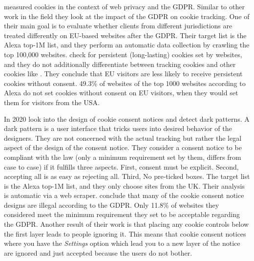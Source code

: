  measured cookies in the context of web privacy and the GDPR. Similar to other work in the
field they look at the impact of the GDPR on cookie tracking. One of their main goal is to evaluate whether clients from
different jurisdictions are treated differently on EU-based websites after the GDPR. Their target list is the Alexa
top-1M list, and they perform an automatic data collection by crawling the top 100,000 websites.
\citeauthor{dabrowski2019measuring} check for persistent (long-lasting) cookies set by websites, and they do not
additionally differentiate between tracking cookies and other cookies like . They conclude that EU
visitors are less likely to receive persistent cookies without consent. 49.3\% of websites of the top 1000 websites
according to Alexa do not set cookies without consent on EU visitors, when they would set them for visitors from the USA.

In 2020  look into the design of cookie consent notices and detect dark patterns. A dark pattern is
a user interface that tricks users into desired behavior of the designers. They are not
concerned with the actual tracking but rather the legal aspect of the design of the consent notice. They consider a
consent notice to be compliant with the law (only a minimum requirement set by them, differs from case to case) if it
fulfills three aspects. First, consent must be explicit. Second, accepting all is as easy as rejecting all. Third, No
pre-ticked boxes. The target list is
the Alexa top-1M list, and they only choose sites from the UK. Their analysis is automatic via a web scraper.
\citeauthor{nouwens2020dark} conclude that many of the cookie consent notice designs are illegal according to the GDPR.
Only 11.8\% of websites they considered meet the minimum requirement they set to be acceptable regarding the GDPR.
Another result of their work is that placing any cookie controls below the first layer leads to people ignoring it. This
means that cookie consent notices where you have the \emph{Settings} option which lead you to a new layer of the notice
are ignored and just accepted because the users do not bother.

